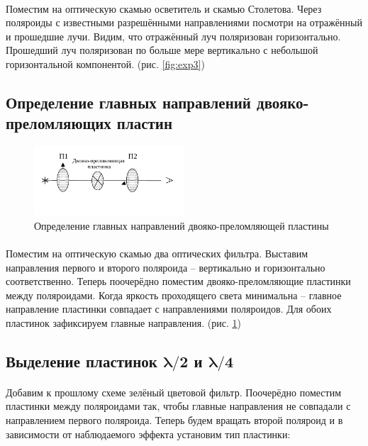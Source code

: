 \documentclass[a4paper,12pt]{article} %
\begin{document}
\paragraph{} Поместим на оптическую скамью осветитель и скамью Столетова. Через поляроиды с известными разрешёнными направлениями посмотри на отражённый и прошедшие лучи. Видим, что отражённый луч поляризован горизонтально. Прошедший луч поляризован по больше мере вертикально с небольшой горизонтальной компонентой. (рис. \ref{fig:exp3})

\subsection{Определение главных направлений двояко-преломляющих пластин}

\begin{figure}[h]
\center
\includegraphics[width=0.5\textwidth]{exp4.pdf}
\caption{Определение главных направлений двояко-преломляющей пластины}
\label{fig:exp4}
\end{figure}


\paragraph{} Поместим на оптическую скамью два оптических фильтра. Выставим направления первого и второго поляроида -- вертикально и горизонтально соответственно. Теперь поочерёдно поместим двояко-преломляющие пластинки между поляроидами. Когда яркость проходящего света минимальна -- главное направление пластинки совпадает с направлениями поляроидов. Для обоих пластинок зафиксируем главные направления. (рис. \ref{fig:exp4})

\subsection{Выделение пластинок $\boldsymbol\lambda / \mathbf{2}$ и $\boldsymbol\lambda / \mathbf{4}$}

\paragraph{} Добавим к прошлому схеме зелёный цветовой фильтр. Поочерёдно поместим пластинки между поляроидами так, чтобы главные направления не совпадали с направлением первого поляроида. Теперь будем вращать второй поляроид и в зависимости от наблюдаемого эффекта установим тип пластинки: 
\end{document}
